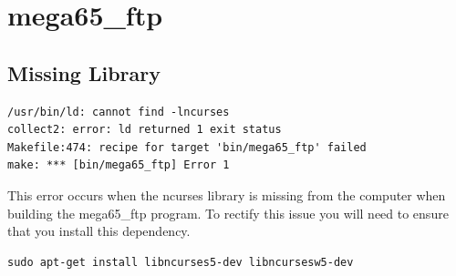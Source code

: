 \section{mega65\_ftp}
    \subsection{Missing Library}
    \begin{tcolorbox}[colback=black,coltext=white]
\begin{lstlisting}
/usr/bin/ld: cannot find -lncurses
collect2: error: ld returned 1 exit status
Makefile:474: recipe for target 'bin/mega65_ftp' failed
make: *** [bin/mega65_ftp] Error 1\end{lstlisting}
    \end{tcolorbox}
This error occurs when the ncurses library is missing from the computer when building the mega65\_ftp program.
To rectify this issue you will need to ensure that you install this dependency.

    \begin{tcolorbox}[colback=black,coltext=white]
\begin{lstlisting}
sudo apt-get install libncurses5-dev libncursesw5-dev\end{lstlisting}
    \end{tcolorbox}

